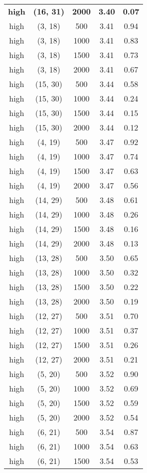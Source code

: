 \begin{tabular}{c c c c c}
\textbf{high} & \textbf{(16, 31)} & \textbf{ 2000} & \textbf{3.40} & \textbf{0.07} \\
high & (3, 18) &  500 & 3.41 & 0.94 \\
high & (3, 18) &  1000 & 3.41 & 0.83 \\
high & (3, 18) &  1500 & 3.41 & 0.73 \\
high & (3, 18) &  2000 & 3.41 & 0.67 \\
high & (15, 30) &  500 & 3.44 & 0.58 \\
high & (15, 30) &  1000 & 3.44 & 0.24 \\
high & (15, 30) &  1500 & 3.44 & 0.15 \\
high & (15, 30) &  2000 & 3.44 & 0.12 \\
high & (4, 19) &  500 & 3.47 & 0.92 \\
high & (4, 19) &  1000 & 3.47 & 0.74 \\
high & (4, 19) &  1500 & 3.47 & 0.63 \\
high & (4, 19) &  2000 & 3.47 & 0.56 \\
high & (14, 29) &  500 & 3.48 & 0.61 \\
high & (14, 29) &  1000 & 3.48 & 0.26 \\
high & (14, 29) &  1500 & 3.48 & 0.16 \\
high & (14, 29) &  2000 & 3.48 & 0.13 \\
high & (13, 28) &  500 & 3.50 & 0.65 \\
high & (13, 28) &  1000 & 3.50 & 0.32 \\
high & (13, 28) &  1500 & 3.50 & 0.22 \\
high & (13, 28) &  2000 & 3.50 & 0.19 \\
high & (12, 27) &  500 & 3.51 & 0.70 \\
high & (12, 27) &  1000 & 3.51 & 0.37 \\
high & (12, 27) &  1500 & 3.51 & 0.26 \\
high & (12, 27) &  2000 & 3.51 & 0.21 \\
high & (5, 20) &  500 & 3.52 & 0.90 \\
high & (5, 20) &  1000 & 3.52 & 0.69 \\
high & (5, 20) &  1500 & 3.52 & 0.59 \\
high & (5, 20) &  2000 & 3.52 & 0.54 \\
high & (6, 21) &  500 & 3.54 & 0.87 \\
high & (6, 21) &  1000 & 3.54 & 0.63 \\
high & (6, 21) &  1500 & 3.54 & 0.53 \\

\end{tabular}
